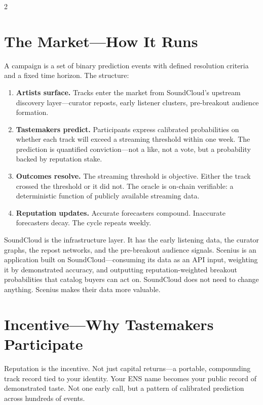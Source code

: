 \documentclass[9pt,oneside]{amsart}
\begin{document}
\begin{multicols}{2}
\section{The Market---How It Runs}

A campaign is a set of binary prediction events with defined resolution criteria and a fixed time horizon. The structure:

\begin{enumerate}[nosep]
  \item \textbf{Artists surface.} Tracks enter the market from SoundCloud's upstream discovery layer---curator reposts, early listener clusters, pre-breakout audience formation.
  \item \textbf{Tastemakers predict.} Participants express calibrated probabilities on whether each track will exceed a streaming threshold within one week. The prediction is quantified conviction---not a like, not a vote, but a probability backed by reputation stake.
  \item \textbf{Outcomes resolve.} The streaming threshold is objective. Either the track crossed the threshold or it did not. The oracle is on-chain verifiable: a deterministic function of publicly available streaming data.
  \item \textbf{Reputation updates.} Accurate forecasters compound. Inaccurate forecasters decay. The cycle repeats weekly.
\end{enumerate}

SoundCloud is the infrastructure layer. It has the early listening data, the curator graphs, the repost networks, and the pre-breakout audience signals. Scenius is an application built on SoundCloud---consuming its data as an API input, weighting it by demonstrated accuracy, and outputting reputation-weighted breakout probabilities that catalog buyers can act on. SoundCloud does not need to change anything. Scenius makes their data more valuable.

\section{Incentive---Why Tastemakers Participate}

Reputation is the incentive. Not just capital returns---a portable, compounding track record tied to your identity. Your ENS name becomes your public record of demonstrated taste. Not one early call, but a pattern of calibrated prediction across hundreds of events.


\end{multicols}
\end{document}
